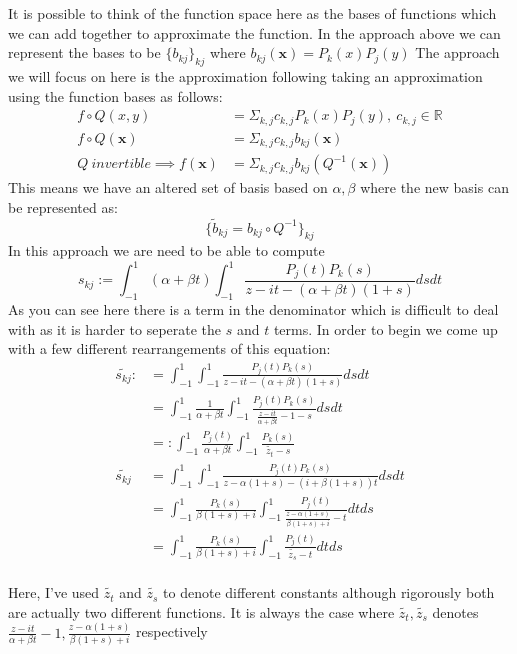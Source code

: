 \documentclass{article}
\begin{document}
It is possible to think of the function space here as the bases of functions which we can add together to approximate the function.
In the approach above we can represent the bases to be $\{b_{kj}\}_{kj}$ where $b_{kj}(\textbf{x})=P_k(x)P_j(y)$
The approach we will focus on here is the approximation following taking an approximation using the function bases as follows:
\begin{align}
    f\circ Q(x,y) &= \Sigma_{k,j}c_{k,j}P_k(x)P_j(y),\:c_{k,j}\in \mathbb{R}\\
    f\circ Q(\textbf{x})&=\Sigma_{k,j}c_{k,j}b_{kj}(\textbf{x})\\
    Q\:invertible \implies
    f(\textbf{x})&=\Sigma_{k,j}c_{k,j}b_{kj}(Q^{-1}(\textbf{x}))
\end{align}
This means we have an altered set of basis based on $\alpha,\beta$ where the new basis can be represented as:
$$\{\tilde{b}_{kj}=b_{kj}\circ Q^{-1}\}_{kj}$$
In this approach we are need to be able to compute $$s_{kj}:=\int_{-1}^1 (\alpha+\beta t) \int_{-1}^1 \frac{P_j(t)P_k(s)}
{z-it-(\alpha+\beta t)(1+s)} ds dt$$
As you can see here there is a term in the denominator which is difficult to deal with as it is harder to seperate the $s$ and $t$ terms.
In order to begin we come up with a few different rearrangements of this equation:
\begin{align}
\tilde{s_{kj}} :&= \int_{-1}^1 \int_{-1}^1 \frac{P_j(t)P_k(s)}
{z-it-(\alpha+\beta t)(1+s)} ds dt\\
&= \int_{-1}^1\frac{1}{\alpha+\beta t}\int_{-1}^1 \frac{P_j(t)P_k(s)}
{\frac{z-it}{\alpha+\beta t}-1-s}dsdt\\
&=: \int_{-1}^1\frac{P_j(t)}{\alpha+\beta t}\int_{-1}^1 \frac{P_k(s)}{\tilde{z_t}-s} \\
\tilde{s_{kj}} &= \int_{-1}^1\int_{-1}^1
\frac{P_j(t)P_k(s)}{z-\alpha(1+s)-(i+\beta(1+s))t}dsdt \\
&= \int_{-1}^1\frac{P_k(s)}{\beta(1+s)+i}\int_{-1}^1 \frac{P_j(t)}{
	\frac{z-\alpha(1+s)}{\beta(1+s)+i}-t}dtds\\
&= \int_{-1}^1\frac{P_k(s)}{\beta(1+s)+i}\int_{-1}^1 \frac{P_j(t)}{
\tilde{z_s}-t}dtds\\
\end{align}

Here, I've used $\tilde{z_t}$ and $\tilde{z_s}$ to denote different constants although rigorously both are actually two different functions.
It is always the case where $\tilde{z_t}, \tilde{z_s}$ denotes
$\frac{z-it}{\alpha+\beta t}-1,\frac{z-\alpha(1+s)}{\beta(1+s)+i}$ respectively
\end{document}

